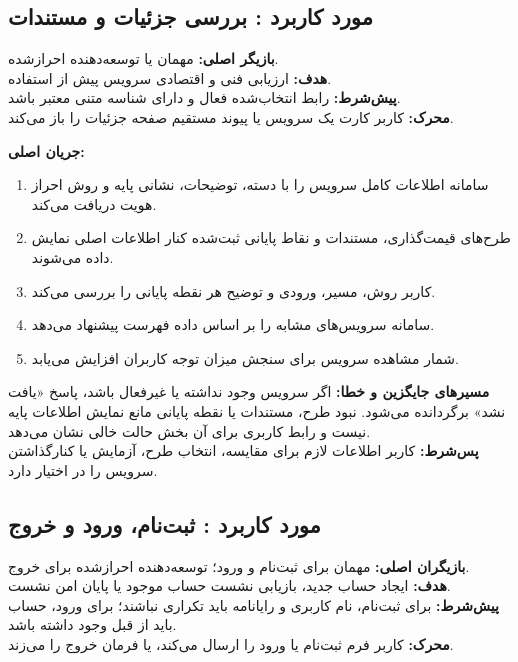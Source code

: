 \UseCaseStart
\subsection{مورد کاربرد : بررسی جزئیات و مستندات}
\noindent\textbf{بازیگر اصلی:} مهمان یا توسعه‌دهنده احرازشده.\\
\textbf{هدف:} ارزیابی فنی و اقتصادی سرویس پیش از استفاده.\\
\textbf{پیش‌شرط:} رابط انتخاب‌شده فعال و دارای شناسه متنی معتبر باشد.\\
\textbf{محرک:} کاربر کارت یک سرویس یا پیوند مستقیم صفحه جزئیات را باز می‌کند.


\noindent\textbf{جریان اصلی:}
\begin{enumerate}
  \item سامانه اطلاعات کامل سرویس را با دسته، توضیحات، نشانی پایه و روش احراز هویت دریافت می‌کند.
  \item طرح‌های قیمت‌گذاری، مستندات و نقاط پایانی ثبت‌شده کنار اطلاعات اصلی نمایش داده می‌شوند.
  \item کاربر روش، مسیر، ورودی و توضیح هر نقطه پایانی را بررسی می‌کند.
  \item سامانه سرویس‌های مشابه را بر اساس داده فهرست پیشنهاد می‌دهد.
  \item شمار مشاهده سرویس برای سنجش میزان توجه کاربران افزایش می‌یابد.
\end{enumerate}

\noindent\textbf{مسیرهای جایگزین و خطا:}
اگر سرویس وجود نداشته یا غیرفعال باشد، پاسخ «یافت نشد» برگردانده می‌شود. نبود طرح، مستندات یا نقطه پایانی مانع نمایش اطلاعات پایه نیست و رابط کاربری برای آن بخش حالت خالی نشان می‌دهد.\\
\textbf{پس‌شرط:} کاربر اطلاعات لازم برای مقایسه، انتخاب طرح، آزمایش یا کنارگذاشتن سرویس را در اختیار دارد.

\UseCaseStart
\subsection{مورد کاربرد : ثبت‌نام، ورود و خروج}
\noindent\textbf{بازیگران اصلی:} مهمان برای ثبت‌نام و ورود؛ توسعه‌دهنده احرازشده برای خروج.\\
\textbf{هدف:} ایجاد حساب جدید، بازیابی نشست حساب موجود یا پایان امن نشست.\\
\textbf{پیش‌شرط:} برای ثبت‌نام، نام کاربری و رایانامه باید تکراری نباشند؛ برای ورود، حساب باید از قبل وجود داشته باشد.\\
\textbf{محرک:} کاربر فرم ثبت‌نام یا ورود را ارسال می‌کند، یا فرمان خروج را می‌زند.

